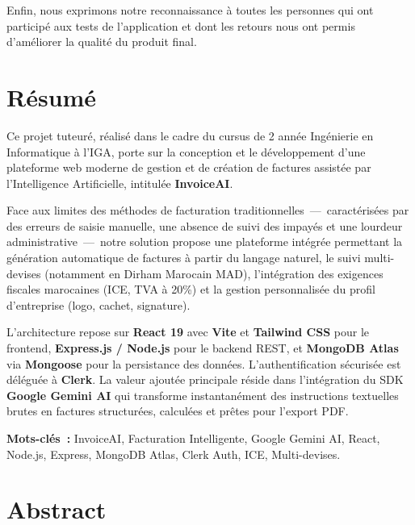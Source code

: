 \documentclass[a4paper,12pt]{extarticle}
\begin{document}
Enfin, nous exprimons notre reconnaissance à toutes les personnes qui ont participé aux tests de l'application et dont les retours nous ont permis d'améliorer la qualité du produit final.

\vfill

\newpage
\thispagestyle{empty}
\section*{Résumé}

Ce projet tuteuré, réalisé dans le cadre du cursus de 2 année Ingénierie en Informatique à l'IGA, porte sur la conception et le développement d'une plateforme web moderne de gestion et de création de factures assistée par l'Intelligence Artificielle, intitulée \textbf{InvoiceAI}.

Face aux limites des méthodes de facturation traditionnelles~---~caractérisées par des erreurs de saisie manuelle, une absence de suivi des impayés et une lourdeur administrative~---~notre solution propose une plateforme intégrée permettant la génération automatique de factures à partir du langage naturel, le suivi multi-devises (notamment en Dirham Marocain MAD), l'intégration des exigences fiscales marocaines (ICE, TVA à 20\%) et la gestion personnalisée du profil d'entreprise (logo, cachet, signature).

L'architecture repose sur \textbf{React 19} avec \textbf{Vite} et \textbf{Tailwind CSS} pour le frontend, \textbf{Express.js / Node.js} pour le backend REST, et \textbf{MongoDB Atlas} via \textbf{Mongoose} pour la persistance des données. L'authentification sécurisée est déléguée à \textbf{Clerk}. La valeur ajoutée principale réside dans l'intégration du SDK \textbf{Google Gemini AI} qui transforme instantanément des instructions textuelles brutes en factures structurées, calculées et prêtes pour l'export PDF.

\textbf{Mots-clés~:} InvoiceAI, Facturation Intelligente, Google Gemini AI, React, Node.js, Express, MongoDB Atlas, Clerk Auth, ICE, Multi-devises.

\vfill
\section*{Abstract}
\end{document}
